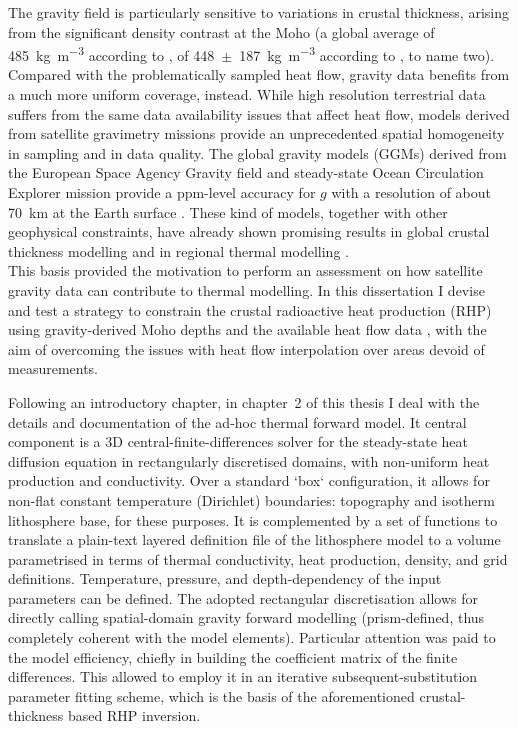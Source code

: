 The gravity field is particularly sensitive to variations in crustal thickness, arising from the significant density contrast at the Moho (a global average of \SI{485}{\kilo \gram \per \cubic \metre} according to \cite{Tenzer2012}, of \num{448}~$\pm$~\SI{187}{\kilo \gram \per \cubic \metre} according to \cite{Sjoberg2011}, to name two).
Compared with the problematically sampled heat flow, gravity data benefits from a much more uniform coverage, instead.
While high resolution terrestrial data suffers from the same data availability issues that affect heat flow, models derived from satellite gravimetry missions provide an unprecedented spatial homogeneity in sampling and in data quality.
The global gravity models (GGMs) derived from the European Space Agency Gravity field and steady-state Ocean Circulation Explorer mission \parencite[GOCE,][]{Floberghagen2011_goce}provide a ppm-level accuracy for $g$ with a resolution of about \SI{70}{\kilo \metre} at the Earth surface \parencites{Brockmann2014}{Kvas_GOCO06s_dataset}.
These kind of models, together with other geophysical constraints, have already shown promising results in global crustal thickness modelling \parencites[e.g.][]{Eshagh2011}{Reguzzoni2015} and in regional thermal modelling \parencite{Bouman2015}.
\\

This basis provided the motivation to perform an assessment on how satellite gravity data can contribute to thermal modelling.
In this dissertation I devise and test a strategy to constrain the crustal radioactive heat production (RHP) using gravity-derived Moho depths and the available heat flow data \parencite{globalHF}, with the aim of overcoming the issues with heat flow interpolation over areas devoid of measurements.

Following an introductory chapter, in chapter~2 of this thesis I deal with the details and documentation of the ad-hoc thermal forward model.
It central component is a 3D central-finite-differences solver for the steady-state heat diffusion equation in rectangularly discretised domains, with non-uniform heat production and conductivity.
Over a standard `box` configuration, it allows for non-flat constant temperature (Dirichlet) boundaries: topography and isotherm lithosphere base, for these purposes.
It is complemented by a set of functions to translate a plain-text layered definition file of the lithosphere model to a volume parametrised in terms of thermal conductivity, heat production, density, and grid definitions.
Temperature, pressure, and depth-dependency of the input parameters can be defined.
The adopted rectangular discretisation allows for directly calling spatial-domain gravity forward modelling (prism-defined, thus completely coherent with the model elements).
Particular attention was paid to the model efficiency, chiefly in building the coefficient matrix of the finite differences.
This allowed to employ it in an iterative subsequent-substitution parameter fitting scheme, which is the basis of the aforementioned crustal-thickness based RHP inversion.
\\

